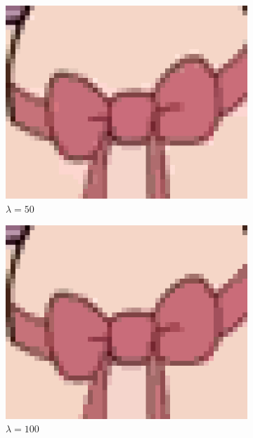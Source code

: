\documentclass[10pt,twocolumn,letterpaper]{article}
\begin{document}
\begin{figure}
\centering
\begin{subfigure}{.48\linewidth}
\includegraphics[width=\linewidth]{alphaResults/bow_large_0050.png}
\caption{$\lambda = 50$}
\end{subfigure}
\begin{subfigure}{.48\linewidth}
\includegraphics[width=\linewidth]{alphaResults/bow_large_0100.png}
\caption{$\lambda = 100$}
\end{subfigure}
\begin{subfigure}{.48\linewidth}

\end{subfigure}
\end{figure}
\end{document}
